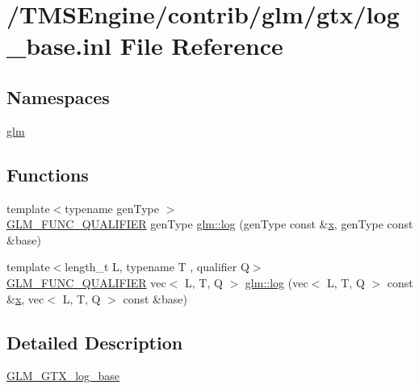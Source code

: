 \hypertarget{log__base_8inl}{}\section{/\+T\+M\+S\+Engine/contrib/glm/gtx/log\+\_\+base.inl File Reference}
\label{log__base_8inl}
\subsection*{Namespaces}
\begin{DoxyCompactItemize}
\item 
 \hyperlink{namespaceglm}{glm}
\end{DoxyCompactItemize}
\subsection*{Functions}
\begin{DoxyCompactItemize}
\item 
{\footnotesize template$<$typename gen\+Type $>$ }\\\hyperlink{setup_8hpp_a33fdea6f91c5f834105f7415e2a64407}{G\+L\+M\+\_\+\+F\+U\+N\+C\+\_\+\+Q\+U\+A\+L\+I\+F\+I\+ER} gen\+Type \hyperlink{group__gtx__log__base_ga60a7b0a401da660869946b2b77c710c9}{glm\+::log} (gen\+Type const \&\hyperlink{_s_d_l__opengl_8h_ad0e63d0edcdbd3d79554076bf309fd47}{x}, gen\+Type const \&base)
\item 
{\footnotesize template$<$length\+\_\+t L, typename T , qualifier Q$>$ }\\\hyperlink{setup_8hpp_a33fdea6f91c5f834105f7415e2a64407}{G\+L\+M\+\_\+\+F\+U\+N\+C\+\_\+\+Q\+U\+A\+L\+I\+F\+I\+ER} vec$<$ L, T, Q $>$ \hyperlink{namespaceglm_a2b3dd2e2389685ab1a11a30ca5f0ba2d}{glm\+::log} (vec$<$ L, T, Q $>$ const \&\hyperlink{_s_d_l__opengl_8h_ad0e63d0edcdbd3d79554076bf309fd47}{x}, vec$<$ L, T, Q $>$ const \&base)
\end{DoxyCompactItemize}


\subsection{Detailed Description}
\hyperlink{group__gtx__log__base}{G\+L\+M\+\_\+\+G\+T\+X\+\_\+log\+\_\+base} 